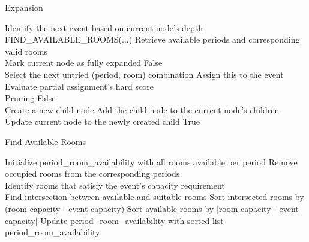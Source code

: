\begin{algorithm}
\caption{Expansion}\label{expansion}
\begin{algorithmic}[1]
	\State Identify the next event based on current node’s depth
	\State FIND\_AVAILABLE\_ROOMS(...) \Comment Retrieve available periods and corresponding valid rooms 
\\
		\State Mark current node as fully expanded
		\State \Return False
	\EndIf
\\
	\State Select the next untried (period, room) combination
	\State Assign this to the event
\\
    \State Evaluate partial assignment's hard score
\\
		\State Pruning
		\State \Return False
	\EndIf
\\
	\State Create a new child node
	\State Add the child node to the current node’s children
	\State Update current node to the newly created child
	\State \Return True    
\EndFunction
\end{algorithmic}
\end{algorithm}

\begin{algorithm}
\caption{Find Available Rooms}\label{find_available_rooms}
\begin{algorithmic}[1]
    \State Initialize period\_room\_availability with all rooms available per period
        \State Remove occupied rooms from the corresponding periods
    \EndFor
\\
    \State Identify rooms that satisfy the event's capacity requirement
\\
            \State Find intersection between available and suitable rooms
                \State Sort intersected rooms by (room capacity - event capacity)
            \Else
                \State Sort available rooms by $|$room capacity - event capacity$|$
            \EndIf
            \State Update period\_room\_availability with sorted list
        \EndIf
    \EndFor
\\
    \State \Return period\_room\_availability
\EndFunction
\end{algorithmic}
\end{algorithm}

